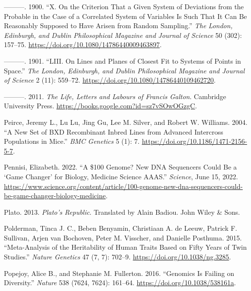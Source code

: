 \documentclass[
]{book}
\newlength{\cslhangindent}
\newlength{\cslentryspacingunit} %
\newenvironment{CSLReferences}[2] %
 {%
  \setlength{\parindent}{0pt}
  \ifodd #1
  \let\oldpar\par
  \def\par{\hangindent=\cslhangindent\oldpar}
  \fi
  \setlength{\parskip}{#2\cslentryspacingunit}
 }%
 {}
\begin{document}
\begin{CSLReferences}{1}{0}
\leavevmode{}%
---------. 1900. {``X. {On} the Criterion That a Given System of Deviations from the Probable in the Case of a Correlated System of Variables Is Such That It Can Be Reasonably Supposed to Have Arisen from Random Sampling.''} \emph{The London, Edinburgh, and Dublin Philosophical Magazine and Journal of Science} 50 (302): 157--75. \url{https://doi.org/10.1080/14786440009463897}.

\leavevmode{}%
---------. 1901. {``{LIII}. {On} Lines and Planes of Closest Fit to Systems of Points in Space.''} \emph{The London, Edinburgh, and Dublin Philosophical Magazine and Journal of Science} 2 (11): 559--72. \url{https://doi.org/10.1080/14786440109462720}.

\leavevmode{}%
---------. 2011. \emph{The {Life}, {Letters} and {Labours} of {Francis Galton}}. {Cambridge University Press}. \url{https://books.google.com?id=sz7vSOwOGzgC}.

\leavevmode{}%
Peirce, Jeremy L., Lu Lu, Jing Gu, Lee M. Silver, and Robert W. Williams. 2004. {``A New Set of {BXD} Recombinant Inbred Lines from Advanced Intercross Populations in Mice.''} \emph{BMC Genetics} 5 (1): 7. \url{https://doi.org/10.1186/1471-2156-5-7}.

\leavevmode{}%
Pennisi, Elizabeth. 2022. {``A \$100 Genome? {New DNA} Sequencers Could Be a {`Game Changer'} for Biology, Medicine \textbar{} {Science} \textbar{} {AAAS}.''} \emph{Science}, June 15, 2022. \url{https://www.science.org/content/article/100-genome-new-dna-sequencers-could-be-game-changer-biology-medicine}.

\leavevmode{}%
Plato. 2013. \emph{Plato's {Republic}}. Translated by Alain Badiou. {John Wiley \& Sons}.

\leavevmode{}%
Polderman, Tinca J. C., Beben Benyamin, Christiaan A. de Leeuw, Patrick F. Sullivan, Arjen van Bochoven, Peter M. Visscher, and Danielle Posthuma. 2015. {``Meta-Analysis of the Heritability of Human Traits Based on Fifty Years of Twin Studies.''} \emph{Nature Genetics} 47 (7, 7): 702--9. \url{https://doi.org/10.1038/ng.3285}.

\leavevmode{}%
Popejoy, Alice B., and Stephanie M. Fullerton. 2016. {``Genomics Is Failing on Diversity.''} \emph{Nature} 538 (7624, 7624): 161--64. \url{https://doi.org/10.1038/538161a}.


\end{CSLReferences}
\end{document}
